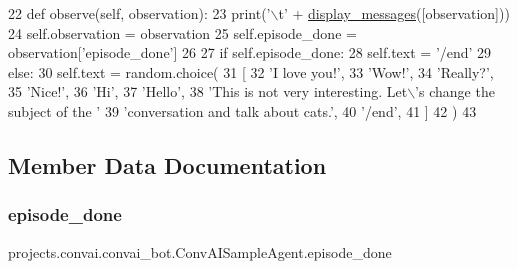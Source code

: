 \begin{DoxyCode}
22     \textcolor{keyword}{def }observe(self, observation):
23         print(\textcolor{stringliteral}{'\(\backslash\)t'} + \hyperlink{namespaceparlai_1_1utils_1_1misc_a7c86f996f4b55a960da46c1142a2c507}{display\_messages}([observation]))
24         self.observation = observation
25         self.episode\_done = observation[\textcolor{stringliteral}{'episode\_done'}]
26 
27         \textcolor{keywordflow}{if} self.episode\_done:
28             self.text = \textcolor{stringliteral}{'/end'}
29         \textcolor{keywordflow}{else}:
30             self.text = random.choice(
31                 [
32                     \textcolor{stringliteral}{'I love you!'},
33                     \textcolor{stringliteral}{'Wow!'},
34                     \textcolor{stringliteral}{'Really?'},
35                     \textcolor{stringliteral}{'Nice!'},
36                     \textcolor{stringliteral}{'Hi'},
37                     \textcolor{stringliteral}{'Hello'},
38                     \textcolor{stringliteral}{'This is not very interesting. Let\(\backslash\)'s change the subject of the '}
39                     \textcolor{stringliteral}{'conversation and talk about cats.'},
40                     \textcolor{stringliteral}{'/end'},
41                 ]
42             )
43 
\end{DoxyCode}


\subsection{Member Data Documentation}
\mbox{\label{classprojects_1_1convai_1_1convai__bot_1_1ConvAISampleAgent_a8bdf2e2fcc4defb29becfd02e23f058e}} 
\subsubsection{\texorpdfstring{episode\+\_\+done}{episode\_done}}
{\footnotesize\ttfamily projects.\+convai.\+convai\+\_\+bot.\+Conv\+A\+I\+Sample\+Agent.\+episode\+\_\+done}



